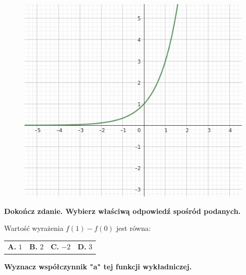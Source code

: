 \documentclass[12pt,a4paper]{article}
\theoremstyle{break}
\begin{document}
	\begin{figure}[h]
		\centering
		\includegraphics[scale=0.7]{r1.jpeg}
	\end{figure}

	
	\begin{zad}[0-1]
		\textbf{Dokończ zdanie. Wybierz właściwą odpowiedź spośród podanych.}
	\end{zad} 
	
	Wartość wyrażenia $f(1)-f(0)$ jest równa:
	
	\vspace{0.5cm}
	\begin{tabular}{p{3.5cm} p{3.5cm} p{3.5cm} p{3.5cm}}
		\textbf{A. }$1$&
		\textbf{B. }$2$&
		\textbf{C. }$-2$&
		\textbf{D. }$3$\\
	\end{tabular}


	\begin{zad}[0-3]
		\textbf{Wyznacz współczynnik "a" tej funkcji wykładniczej.}
	\end{zad} 
	
\end{document}
